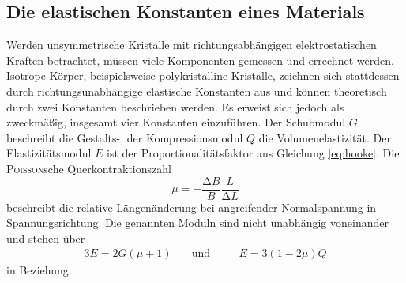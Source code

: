 \subsection{Die elastischen Konstanten eines Materials}
Werden unsymmetrische Kristalle mit richtungsabhängigen elektrostatischen Kräften betrachtet, müssen  viele Komponenten gemessen und errechnet werden. 
Isotrope Körper, beispielsweise polykristalline Kristalle, zeichnen sich stattdessen durch richtungsunabhängige elastische Konstanten aus und können theoretisch durch zwei Konstanten beschrieben werden. 
Es erweist sich jedoch als zweckmäßig, insgesamt vier Konstanten einzuführen.
Der Schubmodul $G$ beschreibt die Gestalts-, der Kompressionsmodul $Q$ die Volumenelastizität.
Der Elastizitätsmodul $E$ ist der Proportionalitätsfaktor aus Gleichung \eqref{eq:hooke}. 
Die \textsc{Poisson}sche Querkontraktionszahl
\begin{equation}
\mu=-\frac{\mathup{\Delta}{B}}{B}\frac{L}{\mathup{\Delta}{L}}
\label{eq:mu}
\end{equation}
beschreibt die relative Längenänderung bei angreifender Normalspannung in Spannungsrichtung.
Die genannten Moduln sind nicht unabhängig voneinander und stehen über
\begin{alignat}{3}
	 E=2G(\mu+1) &\quad\text{und} &&\quad E=3(1-2\mu)Q
\label{eq:modulbeziehungen}
\end{alignat}
in Beziehung.

